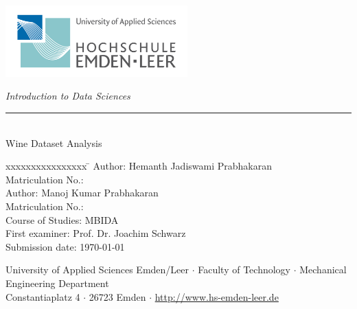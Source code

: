 %
%

\begin{titlepage}
    
    \begin{flushleft} 
        \includegraphics[width=7cm]{General/Logo.png}
    \end{flushleft} 
    
    \begin{flushright}
        \vspace{2cm}
        \LARGE \textsl{Introduction to Data Sciences}\\
        \rule{0.6\textwidth}{0.4pt} ~\\
        \vspace{0.5cm}
        \textsf{\LARGE Wine Dataset Analysis}\\
    \end{flushright}
    
    \vspace{3cm}
    \large
    \begin{tabbing}
        xxxxxxxxxxxxxxxx \= \kill
        Author: \> Hemanth Jadiswami Prabhakaran \\
        Matriculation No.:  \\
        Author: \> Manoj Kumar Prabhakaran \\
        Matriculation No.:  \\
        Course of Studies: \> MBIDA \\ [0.5cm]
        First examiner: \> Prof. Dr. Joachim Schwarz \\
        Submission date: \> \today \\
    \end{tabbing}
    
    \vspace{3cm}
    \small
    \begin{center}
        University of Applied Sciences Emden/Leer $\cdot$ 
        Faculty of Technology $\cdot$ 
        Mechanical Engineering Department \\
        Constantiaplatz 4 $\cdot$ 
        26723 Emden $\cdot$ 
        \url{http://www.hs-emden-leer.de}
    \end{center}
    
\end{titlepage}
